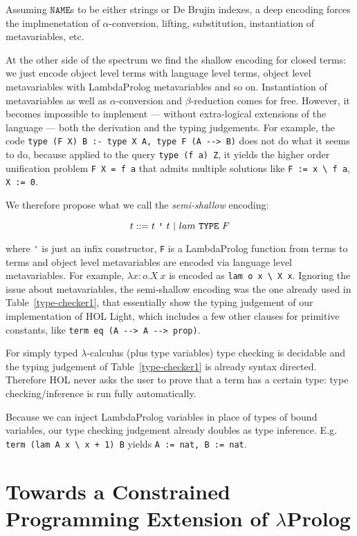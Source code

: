 \documentclass[preprint]{sigplanconf}
\begin{document}
Assuming $\mathtt{NAME}$s to be either strings or De Brujin indexes, a deep encoding forces the implmenetation of $\alpha$-conversion, lifting, substitution, instantiation of metavariables, etc.

At the other side of the spectrum we find the shallow encoding for closed terms: we just encode object level terms with language level terms, object level metavariables with LambdaProlog metavariables and so on. Instantiation of metavariables as well as $\alpha$-conversion and $\beta$-reduction comes for free. However, it becomes impossible to implement --- without extra-logical extensions of the language --- both the derivation and the typing judgements. For example, the code
\verb+type (F X) B :- type X A, type F (A --> B)+ does not do what it seems to
do, because applied to the query \verb+type (f a) Z+, it yields the higher order
unification problem \verb+F X = f a+ that admits multiple solutions like
\verb+F := x \ f a+, \verb+X := 0+.

We therefore propose what we call the \emph{semi-shallow} encoding:

$$t ::= t~\verb+'+~t ~|~ lam~\mathtt{TYPE}~F$$

where \verb+'+ is just an infix constructor, \verb+F+ is a LambdaProlog function from terms to terms and object level metavariables are encoded via language level metavariables. For example, $\lambda x\!:\!o. X~x$ is encoded as
\verb+lam o x \ X x+. Ignoring the issue about metavariables, the semi-shallow encoding was the one already used in Table~\ref{type-checker1}, that essentially show the typing judgement of our implementation of HOL Light, which includes a few other clauses for primitive constants, like \verb+term eq (A --> A --> prop)+.

For simply typed $\lambda$-calculus (plus type variables) type checking is decidable and the typing judgement of Table~\ref{type-checker1} is already syntax directed. Therefore HOL never asks the user to prove that a term has a certain type: type checking/inference is run fully automatically.

Because we can inject LambdaProlog variables in place of types of bound variables, our type checking judgement already doubles as type inference. E.g. \verb/term (lam A x \ x + 1) B/ yields \verb+A := nat, B := nat+.

\section{Towards a Constrained Programming Extension of $\lambda$Prolog}
\label{cholp}
\end{document}
